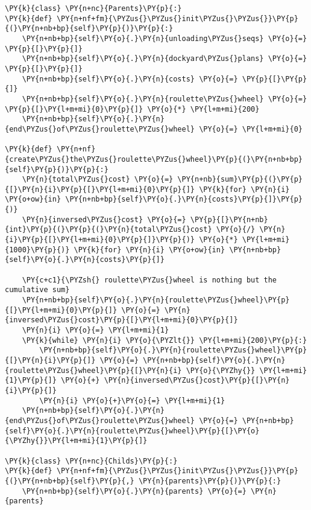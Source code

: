 \begin{tcolorbox}[breakable, size=fbox, boxrule=1pt, pad at break*=1mm,colback=cellbackground, colframe=cellborder]
\begin{Verbatim}[commandchars=\\\{\}]
\PY{k}{class} \PY{n+nc}{Parents}\PY{p}{:}
\PY{k}{def} \PY{n+nf+fm}{\PYZus{}\PYZus{}init\PYZus{}\PYZus{}}\PY{p}{(}\PY{n+nb+bp}{self}\PY{p}{)}\PY{p}{:}
    \PY{n+nb+bp}{self}\PY{o}{.}\PY{n}{unloading\PYZus{}seqs} \PY{o}{=} \PY{p}{[}\PY{p}{]}
    \PY{n+nb+bp}{self}\PY{o}{.}\PY{n}{dockyard\PYZus{}plans} \PY{o}{=} \PY{p}{[}\PY{p}{]}
    \PY{n+nb+bp}{self}\PY{o}{.}\PY{n}{costs} \PY{o}{=} \PY{p}{[}\PY{p}{]}
    \PY{n+nb+bp}{self}\PY{o}{.}\PY{n}{roulette\PYZus{}wheel} \PY{o}{=} \PY{p}{[}\PY{l+m+mi}{0}\PY{p}{]} \PY{o}{*} \PY{l+m+mi}{200}
    \PY{n+nb+bp}{self}\PY{o}{.}\PY{n}{end\PYZus{}of\PYZus{}roulette\PYZus{}wheel} \PY{o}{=} \PY{l+m+mi}{0}

\PY{k}{def} \PY{n+nf}{create\PYZus{}the\PYZus{}roulette\PYZus{}wheel}\PY{p}{(}\PY{n+nb+bp}{self}\PY{p}{)}\PY{p}{:}
    \PY{n}{total\PYZus{}cost} \PY{o}{=} \PY{n+nb}{sum}\PY{p}{(}\PY{p}{[}\PY{n}{i}\PY{p}{[}\PY{l+m+mi}{0}\PY{p}{]} \PY{k}{for} \PY{n}{i} \PY{o+ow}{in} \PY{n+nb+bp}{self}\PY{o}{.}\PY{n}{costs}\PY{p}{]}\PY{p}{)}
    \PY{n}{inversed\PYZus{}cost} \PY{o}{=} \PY{p}{[}\PY{n+nb}{int}\PY{p}{(}\PY{p}{(}\PY{n}{total\PYZus{}cost} \PY{o}{/} \PY{n}{i}\PY{p}{[}\PY{l+m+mi}{0}\PY{p}{]}\PY{p}{)} \PY{o}{*} \PY{l+m+mi}{1000}\PY{p}{)} \PY{k}{for} \PY{n}{i} \PY{o+ow}{in} \PY{n+nb+bp}{self}\PY{o}{.}\PY{n}{costs}\PY{p}{]}

    \PY{c+c1}{\PYZsh{} roulette\PYZus{}wheel is nothing but the cumulative sum}
    \PY{n+nb+bp}{self}\PY{o}{.}\PY{n}{roulette\PYZus{}wheel}\PY{p}{[}\PY{l+m+mi}{0}\PY{p}{]} \PY{o}{=} \PY{n}{inversed\PYZus{}cost}\PY{p}{[}\PY{l+m+mi}{0}\PY{p}{]}
    \PY{n}{i} \PY{o}{=} \PY{l+m+mi}{1}
    \PY{k}{while} \PY{n}{i} \PY{o}{\PYZlt{}} \PY{l+m+mi}{200}\PY{p}{:}
        \PY{n+nb+bp}{self}\PY{o}{.}\PY{n}{roulette\PYZus{}wheel}\PY{p}{[}\PY{n}{i}\PY{p}{]} \PY{o}{=} \PY{n+nb+bp}{self}\PY{o}{.}\PY{n}{roulette\PYZus{}wheel}\PY{p}{[}\PY{n}{i} \PY{o}{\PYZhy{}} \PY{l+m+mi}{1}\PY{p}{]} \PY{o}{+} \PY{n}{inversed\PYZus{}cost}\PY{p}{[}\PY{n}{i}\PY{p}{]}
        \PY{n}{i} \PY{o}{+}\PY{o}{=} \PY{l+m+mi}{1}
    \PY{n+nb+bp}{self}\PY{o}{.}\PY{n}{end\PYZus{}of\PYZus{}roulette\PYZus{}wheel} \PY{o}{=} \PY{n+nb+bp}{self}\PY{o}{.}\PY{n}{roulette\PYZus{}wheel}\PY{p}{[}\PY{o}{\PYZhy{}}\PY{l+m+mi}{1}\PY{p}{]}

\PY{k}{class} \PY{n+nc}{Childs}\PY{p}{:}
\PY{k}{def} \PY{n+nf+fm}{\PYZus{}\PYZus{}init\PYZus{}\PYZus{}}\PY{p}{(}\PY{n+nb+bp}{self}\PY{p}{,} \PY{n}{parents}\PY{p}{)}\PY{p}{:}
    \PY{n+nb+bp}{self}\PY{o}{.}\PY{n}{parents} \PY{o}{=} \PY{n}{parents}


\end{Verbatim}
\end{tcolorbox}
